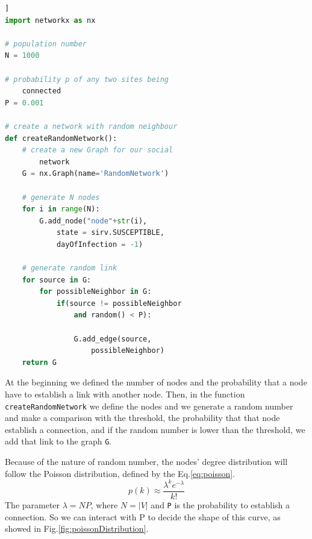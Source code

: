         \begin{lstlisting}[language=Python, frame=single]]
import networkx as nx

# population number
N = 1000

# probability p of any two sites being
    connected
P = 0.001

# create a network with random neighbour
def createRandomNetwork():
    # create a new Graph for our social
        network
    G = nx.Graph(name='RandomNetwork')
    
    # generate N nodes
    for i in range(N):
        G.add_node("node"+str(i), 
            state = sirv.SUSCEPTIBLE,
            dayOfInfection = -1)

    # generate random link
    for source in G:
        for possibleNeighbor in G:
            if(source != possibleNeighbor
                and random() < P):
                
                G.add_edge(source,
                    possibleNeighbor)
    return G
        \end{lstlisting}
        
        At the beginning we defined the number of nodes and the probability that a node have to establish a link with another node.
        Then, in the function \verb|createRandomNetwork| we define the nodes and we generate a random number and make a comparison with the threshold, the probability that that node establish a connection, and if the random number is lower than the threshold, we add that link to the graph \verb|G|.
        
        Because of the nature of random number, the nodes' degree distribution will follow the Poisson distribution, defined by the Eq.\ref{eq:poisson}.
        \begin{equation}\label{eq:poisson}
          p(k) \approx \frac{\lambda^ke^{-\lambda}}{k!}
        \end{equation}
        The parameter $\lambda = N P$, where $N = |V|$ and \verb|P| is the probability to establish a connection. So we can interact with P to decide the shape of this curve, as showed in Fig.\ref{fig:poissonDistribution}\cite{wiky-Poisson}.
        
